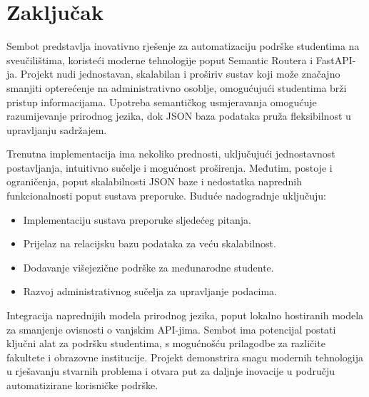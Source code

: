 \section{Zaključak}

Sembot predstavlja inovativno rješenje za automatizaciju podrške studentima na sveučilištima, koristeći moderne tehnologije poput Semantic Routera i FastAPI-ja. Projekt nudi jednostavan, skalabilan i proširiv sustav koji može značajno smanjiti opterećenje na administrativno osoblje, omogućujući studentima brži pristup informacijama. Upotreba semantičkog usmjeravanja omogućuje razumijevanje prirodnog jezika, dok JSON baza podataka pruža fleksibilnost u upravljanju sadržajem.

Trenutna implementacija ima nekoliko prednosti, uključujući jednostavnost postavljanja, intuitivno sučelje i mogućnost proširenja. Međutim, postoje i ograničenja, poput skalabilnosti JSON baze i nedostatka naprednih funkcionalnosti poput sustava preporuke. Buduće nadogradnje uključuju:

\begin{itemize}
    \item Implementaciju sustava preporuke sljedećeg pitanja.
    \item Prijelaz na relacijsku bazu podataka za veću skalabilnost.
    \item Dodavanje višejezične podrške za međunarodne studente.
    \item Razvoj administrativnog sučelja za upravljanje podacima.
\end{itemize}

Integracija naprednijih modela prirodnog jezika, poput lokalno hostiranih modela za smanjenje ovisnosti o vanjskim API-jima.
Sembot ima potencijal postati ključni alat za podršku studentima, s mogućnošću prilagodbe za različite fakultete i obrazovne institucije. Projekt demonstrira snagu modernih tehnologija u rješavanju stvarnih problema i otvara put za daljnje inovacije u području automatizirane korisničke podrške.
